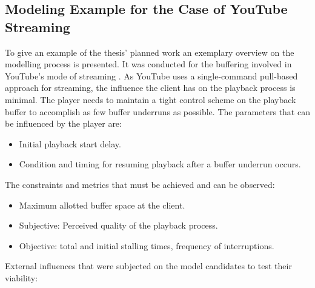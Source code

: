 

  
\subsection{Modeling Example for the Case of YouTube Streaming}

To give an example of the thesis' planned work an exemplary overview on the modelling process is presented. It was conducted for the buffering involved in YouTube's mode of streaming \cite{metzger2011delivery}. As YouTube uses a single-command pull-based approach for streaming, the influence the client has on the playback process is minimal. The player needs to maintain a tight control scheme on the playback buffer to accomplish as few buffer underruns as possible. The parameters that can be influenced by the player are: 

\begin{itemize}
\item Initial playback start delay.
\item Condition and timing for resuming playback after a buffer underrun occurs.
\end{itemize}

The constraints and metrics that must be achieved and can be observed:

\begin{itemize}
\item Maximum allotted buffer space at the client.
\item Subjective: Perceived quality of the playback process.
\item Objective: total and initial stalling times, frequency of interruptions.
\end{itemize}

External influences that were subjected on the model candidates to test their viability:


